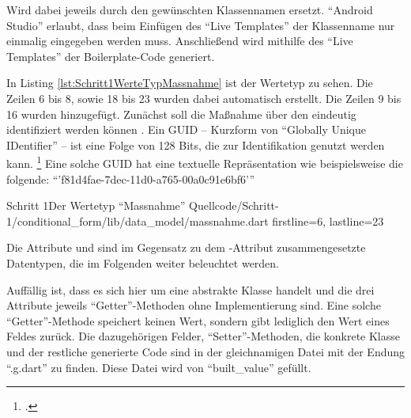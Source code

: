  Wird dabei jeweils durch den gewünschten Klassennamen ersetzt.
\enquote{Android Studio} erlaubt, dass beim Einfügen des \enquote{Live Templates} der Klassenname nur einmalig eingegeben werden muss.
Anschließend wird mithilfe des \enquote{Live Templates} der Boilerplate-Code generiert.

In Listing \ref{lst:Schritt1WerteTypMassnahme} ist der Wertetyp  zu sehen.
Die Zeilen 6 bis 8, sowie 18 bis 23 wurden dabei automatisch erstellt.
Die Zeilen 9 bis 16 wurden hinzugefügt.
Zunächst soll die Maßnahme über den  eindeutig identifiziert werden können .
Ein GUID -- Kurzform von \enquote{Globally Unique IDentifier} -- ist  eine Folge von 128 Bits, die zur Identifikation genutzt werden kann. \footcite[Vgl.][S. 1]{rfc4122}
Eine solche GUID hat eine textuelle Repräsentation wie beispielsweise die folgende: \enquote{'f81d4fae-7dec-11d0-a765-00a0c91e6bf6'}

\begin{alexlisting}{Schritt 1}{Der Wertetyp \enquote{Massnahme}}
  {Quellcode/Schritt-1/conditional_form/lib/data_model/massnahme.dart}
  {firstline=6, lastline=23}
  \label{lst:Schritt1WerteTypMassnahme}
\end{alexlisting}

Die Attribute   und   sind im Gegensatz zu dem -Attribut  zusammengesetzte Datentypen,
die im Folgenden weiter beleuchtet werden.

Auffällig ist, dass es sich hier um eine abstrakte Klasse handelt und die drei Attribute jeweils \enquote{Getter}-Methoden ohne Implementierung sind.
Eine solche \enquote{Getter}-Methode speichert keinen Wert, sondern gibt lediglich den Wert eines Feldes zurück.
Die dazugehörigen Felder, \enquote{Setter}-Methoden,
die konkrete Klasse und der restliche generierte Code sind in der gleichnamigen Datei mit der Endung \enquote{.g.dart}  zu finden.
Diese Datei wird von \enquote{built_value} gefüllt.

